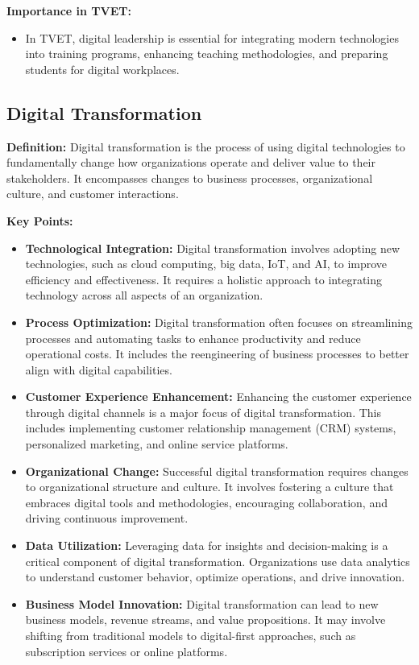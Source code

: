 \documentclass[10pt]{article}
\begin{document}
\textbf{Importance in TVET:}
\begin{itemize}
    \item In TVET, digital leadership is essential for integrating modern technologies into training programs, enhancing teaching methodologies, and preparing students for digital workplaces.
\end{itemize}

\subsection*{Digital Transformation}

\textbf{Definition:} Digital transformation is the process of using digital technologies to fundamentally change how organizations operate and deliver value to their stakeholders. It encompasses changes to business processes, organizational culture, and customer interactions.

\textbf{Key Points:}
\begin{itemize}
    \item \textbf{Technological Integration:} Digital transformation involves adopting new technologies, such as cloud computing, big data, IoT, and AI, to improve efficiency and effectiveness. It requires a holistic approach to integrating technology across all aspects of an organization.
    \item \textbf{Process Optimization:} Digital transformation often focuses on streamlining processes and automating tasks to enhance productivity and reduce operational costs. It includes the reengineering of business processes to better align with digital capabilities.
    \item \textbf{Customer Experience Enhancement:} Enhancing the customer experience through digital channels is a major focus of digital transformation. This includes implementing customer relationship management (CRM) systems, personalized marketing, and online service platforms.
    \item \textbf{Organizational Change:} Successful digital transformation requires changes to organizational structure and culture. It involves fostering a culture that embraces digital tools and methodologies, encouraging collaboration, and driving continuous improvement.
    \item \textbf{Data Utilization:} Leveraging data for insights and decision-making is a critical component of digital transformation. Organizations use data analytics to understand customer behavior, optimize operations, and drive innovation.
    \item \textbf{Business Model Innovation:} Digital transformation can lead to new business models, revenue streams, and value propositions. It may involve shifting from traditional models to digital-first approaches, such as subscription services or online platforms.
\end{itemize}
\end{document}
